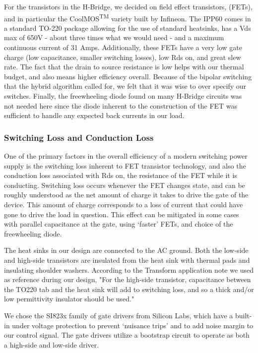 For the transistors in the H-Bridge, we decided on field effect transistors, (FETs), and in particular the CoolMOS\textsuperscript{TM}
variety built by Infineon. The IPP60 comes in a standard TO-220 package allowing for the use of standard heatsinks, has a Vds max of 650V - about three times what we would need - and a maximum continuous current of 31 Amps. Additionally, these FETs have a very low gate charge (low capacitance, smaller switching losses), low Rds on, and great slew rate. The fact that the drain to source resistance is low helps with our thermal budget, and also means higher efficiency overall. Because of the bipolar switching that the hybrid algorithm called for, we felt that it was wise to over specify our switches. Finally, the freewheeling diode found on many H-Bridge circuits was not needed here since the diode inherent to the construction of the FET was sufficient to handle any expected back currents in our load. 

\subsubsection{Switching Loss and Conduction Loss}
One of the primary factors in the overall efficiency of a modern switching power supply is the switching loss inherent to FET transistor technology, and also the conduction loss associated with Rds on, the resistance of the FET while it is conducting. Switching loss occurs whenever the FET changes state, and can be roughly understood as the net amount of charge it takes to drive the gate of the device. This amount of charge corresponds to a loss of current that could have gone to drive the load in question. This effect can be mitigated in some cases with parallel capacitance at the gate, using `faster' FETs, and choice of the freewheeling diode\cite{switchingLoss}.

The heat sinks in our design are connected to the AC ground. Both the low-side and high-side transistors are insulated from the heat sink with thermal pads and insulating shoulder washers. According to the Transform application note we used as reference during our design, "For the high-side transistor, capacitance between the TO220 tab and the heat sink will add to switching loss, and so a thick and/or low permittivity insulator should be used."\cite{transphorm}

We chose the SI823x family of gate drivers from Silicon Labs, which have a built-in under voltage protection to prevent `nuisance trips' and to add noise margin to our control signal. The gate drivers utilize a bootstrap circuit to operate as both a high-side and low-side driver. 

